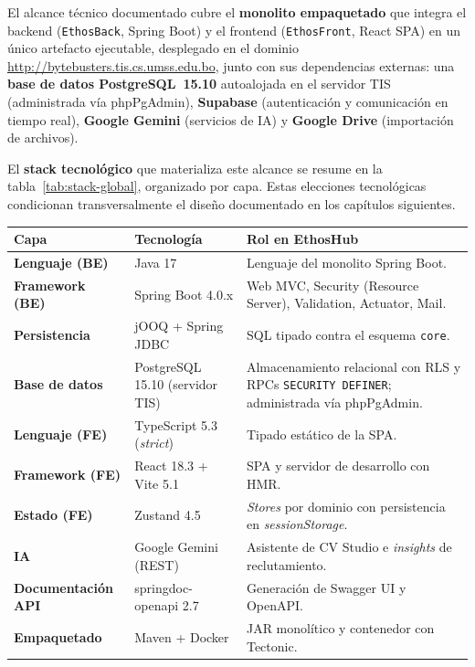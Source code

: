 El alcance técnico documentado cubre el \textbf{monolito empaquetado} que integra el
backend (\texttt{EthosBack}, Spring Boot) y el frontend (\texttt{EthosFront}, React SPA)
en un único artefacto ejecutable, desplegado en el dominio
\url{http://bytebusters.tis.cs.umss.edu.bo}, junto con sus dependencias externas: una
\textbf{base de datos PostgreSQL~15.10} autoalojada en el servidor TIS (administrada vía
phpPgAdmin), \textbf{Supabase} (autenticación y comunicación en tiempo real),
\textbf{Google Gemini} (servicios de IA) y \textbf{Google Drive} (importación de
archivos).

El \textbf{stack tecnológico} que materializa este alcance se resume en la
tabla~\ref{tab:stack-global}, organizado por capa. Estas elecciones tecnológicas
condicionan transversalmente el diseño documentado en los capítulos siguientes.

\clearpage
\vspace{0.2cm}
\noindent
\renewcommand{\arraystretch}{1.35}
\fontsize{8.5}{10.2}\selectfont\sffamily
\begin{tabularx}{\textwidth}{|>{\bfseries\color{colorPrimario}}l|l|X|}
\hline
\rowcolor{headerTabla}
\textbf{Capa} & \textbf{Tecnología} & \textbf{Rol en EthosHub} \\
\hline
Lenguaje (BE) & Java 17 & Lenguaje del monolito Spring Boot. \\
\hline
\rowcolor{grisTecnico}
Framework (BE) & Spring Boot 4.0.x & Web MVC, Security (Resource Server), Validation, Actuator, Mail. \\
\hline
Persistencia & jOOQ + Spring JDBC & SQL tipado contra el esquema \texttt{core}. \\
\hline
\rowcolor{grisTecnico}
Base de datos & PostgreSQL 15.10 (servidor TIS) & Almacenamiento relacional con RLS y RPCs \texttt{SECURITY DEFINER}; administrada vía phpPgAdmin. \\
\hline
Lenguaje (FE) & TypeScript 5.3 (\textit{strict}) & Tipado estático de la SPA. \\
\hline
\rowcolor{grisTecnico}
Framework (FE) & React 18.3 + Vite 5.1 & SPA y servidor de desarrollo con HMR. \\
\hline
Estado (FE) & Zustand 4.5 & \textit{Stores} por dominio con persistencia en \textit{sessionStorage}. \\
\hline
\rowcolor{grisTecnico}
IA & Google Gemini (REST) & Asistente de CV Studio e \textit{insights} de reclutamiento. \\
\hline
Documentación API & springdoc-openapi 2.7 & Generación de Swagger UI y OpenAPI. \\
\hline
\rowcolor{grisTecnico}
Empaquetado & Maven + Docker & JAR monolítico y contenedor con Tectonic. \\
\hline
\end{tabularx}
\label{tab:stack-global}

